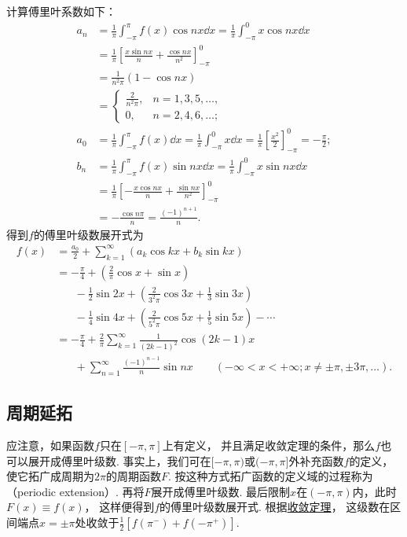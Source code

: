 \begin{example}
\begin{solution}
计算傅里叶系数如下：\begin{align*}
	a_n &= \frac{1}{\pi} \int_{-\pi}^\pi f(x) \cos nx \dd{x}
	= \frac{1}{\pi} \int_{-\pi}^0 x \cos nx \dd{x} \\
	&= \frac{1}{\pi} \left[ \frac{x \sin nx}{n} + \frac{\cos nx}{n^2} \right]_{-\pi}^0 \\
	&= \frac{1}{n^2 \pi} (1-\cos nx) \\
	&= \left\{ \begin{array}{cc}
	\frac{2}{n^2 \pi}, & n=1,3,5,\dotsc, \\
	0, & n=2,4,6,\dotsc;
	\end{array} \right. \\
	a_0 &= \frac{1}{\pi} \int_{-\pi}^\pi f(x) \dd{x}
	= \frac{1}{\pi} \int_{-\pi}^0 x \dd{x}
	= \frac{1}{\pi} \left[ \frac{x^2}{2} \right]_{-\pi}^0 = -\frac{\pi}{2}; \\
	b_n &= \frac{1}{\pi} \int_{-\pi}^\pi f(x) \sin nx \dd{x}
	= \frac{1}{\pi} \int_{-\pi}^0 x \sin nx \dd{x} \\
	&= \frac{1}{\pi} \left[ -\frac{x \cos nx}{n} + \frac{\sin nx}{n^2} \right]_{-\pi}^0 \\
	&= -\frac{\cos n\pi}{n} = \frac{(-1)^{n+1}}{n}.
\end{align*}
得到\(f\)的傅里叶级数展开式为\begin{align*}
	f(x)
	&= \frac{a_0}{2} + \sum_{k=1}^\infty (a_k \cos{kx} + b_k \sin kx) \\
	&= -\frac{\pi}{4} + \left(\frac{2}{\pi} \cos x + \sin x\right) \\
	&\hspace{20pt}-\frac{1}{2}\sin 2x + \left(\frac{2}{3^2\pi}\cos 3x + \frac{1}{3}\sin 3x\right) \\
	&\hspace{20pt}-\frac{1}{4}\sin 4x + \left(\frac{2}{5^2\pi}\cos 5x + \frac{1}{5}\sin 5x\right)
	-\dotsb \\
	&= -\frac{\pi}{4} + \frac{2}{\pi} \sum_{k=1}^\infty \frac{1}{(2k-1)^2} \cos(2k-1)x \\
	&\hspace{20pt}+\sum_{n=1}^\infty \frac{(-1)^{n-1}}{n} \sin nx
		\qquad(-\infty<x<+\infty; x\neq\pm\pi,\pm3\pi,\dotsc).
\end{align*}
\end{solution}
\end{example}

\subsection{周期延拓}
应注意，如果函数\(f\)只在\([-\pi,\pi]\)上有定义，
并且满足收敛定理的条件，那么\(f\)也可以展开成傅里叶级数.
事实上，我们可在\([-\pi,\pi)\)或\((-\pi,\pi]\)外补充函数\(f\)的定义，
使它拓广成周期为\(2\pi\)的周期函数\(F\).
按这种方式拓广函数的定义域的过程称为（periodic extension）.
再将\(F\)展开成傅里叶级数.
最后限制\(x\)在\((-\pi,\pi)\)内，此时\(F(x) \equiv f(x)\)，
这样便得到\(f\)的傅里叶级数展开式.
根据\hyperref[theorem:无穷级数.傅里叶级数收敛的狄利克雷充分条件]{收敛定理}，
这级数在区间端点\(x=\pm\pi\)处收敛于\(\frac{1}{2} [f(\pi^-) + f(-\pi^+)]\).

